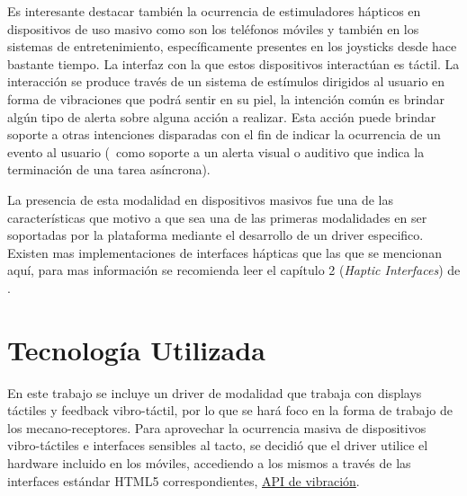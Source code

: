 Es interesante destacar también la ocurrencia de estimuladores hápticos en dispositivos de uso masivo como son los teléfonos móviles y también en los sistemas de entretenimiento, específicamente presentes en los joysticks desde hace bastante tiempo. La interfaz con la que estos dispositivos interactúan es táctil. La interacción se produce través de un sistema de estímulos dirigidos al usuario en forma de vibraciones que podrá sentir en su piel, la intención común es brindar algún tipo de alerta sobre alguna acción a realizar. Esta acción puede brindar soporte a otras intenciones disparadas con el fin de indicar la ocurrencia de un evento al usuario (\ie ~como soporte a un alerta visual o auditivo que indica la terminación de una tarea asíncrona). 

La presencia de esta modalidad en dispositivos masivos fue una de las características que motivo a que sea una de las primeras modalidades en ser soportadas por la plataforma mediante el desarrollo de un driver especifico. 
Existen mas implementaciones de interfaces hápticas que las que se mencionan aquí, para mas información se recomienda leer el capítulo 2 (\emph{Haptic Interfaces}) de \citet{kortum2008hci}.

\section{Tecnología Utilizada}
En este trabajo se incluye un driver de modalidad que trabaja con displays táctiles y feedback vibro-táctil, por lo que se hará foco en la forma de trabajo de los mecano-receptores.
Para aprovechar la ocurrencia masiva de dispositivos vibro-táctiles e interfaces sensibles al tacto, se decidió que el driver utilice el hardware incluido en los móviles, accediendo a los mismos a través de las interfaces estándar HTML5 correspondientes, \eg  \href{http://www.w3.org/TR/vibration/}{API de vibración}.
